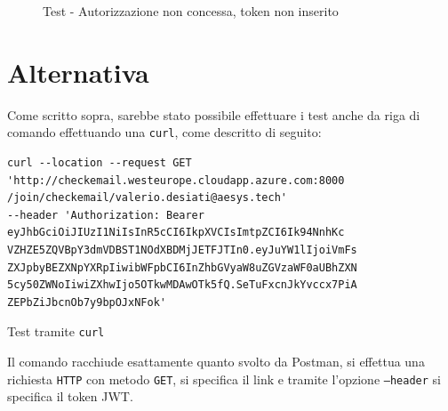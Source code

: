 \begin{figure}[H]
	\centering
	\caption{Test - Autorizzazione non concessa, token non inserito}
	\label{fig:noauth}
\end{figure}

\newpage
\section{Alternativa}\label{sec:testalternativa}
Come scritto sopra, sarebbe stato possibile effettuare i test anche da riga di comando effettuando una \texttt{curl}, come descritto di seguito:
\begin{algorithm}
\centering
\begin{verbatim}
curl --location --request GET 
'http://checkemail.westeurope.cloudapp.azure.com:8000
/join/checkemail/valerio.desiati@aesys.tech'
--header 'Authorization: Bearer 
eyJhbGciOiJIUzI1NiIsInR5cCI6IkpXVCIsImtpZCI6Ik94NnhKc
VZHZE5ZQVBpY3dmVDBST1NOdXBDMjJETFJTIn0.eyJuYW1lIjoiVmFs
ZXJpbyBEZXNpYXRpIiwibWFpbCI6InZhbGVyaW8uZGVzaWF0aUBhZXN
5cy50ZWNoIiwiZXhwIjo5OTkwMDAwOTk5fQ.SeTuFxcnJkYvccx7PiA
ZEPbZiJbcnOb7y9bpOJxNFok'
\end{verbatim}
\caption{Test tramite \texttt{curl}}\label{alg:container_config}
\end{algorithm}

Il comando racchiude esattamente quanto svolto da Postman, si effettua una richiesta \texttt{HTTP} con metodo \texttt{GET}, 
si specifica il link e tramite l'opzione \texttt{--header} si specifica il token JWT.